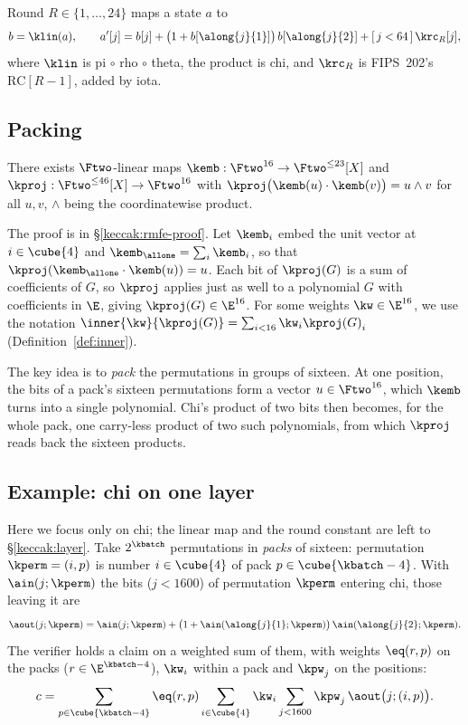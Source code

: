 Round $R\in\{1,\dots,24\}$ maps a state $a$ to
\begin{equation}\label{keccak:eq:round}
b=\klin(a),\qquad a'[j]=b[j]+\bigl(1+b[\along{j}{1}]\bigr)\,b[\along{j}{2}]+[\,j<64\,]\,\krc_R[j],
\end{equation}
where $\klin$ is pi $\circ$ rho $\circ$ theta, the product is chi, and $\krc_R$ is FIPS~202's $\mathrm{RC}[R-1]$, added by iota.

\subsection{Packing}\label{keccak:rmfe}

\begin{lemma}[Embedding]\label{lem:rmfe}
There exists $\Ftwo$-linear maps $\kemb:\Ftwo^{16}\to\Ftwo^{\le23}[X]$ and $\kproj:\Ftwo^{\le46}[X]\to\Ftwo^{16}$ with $\kproj\bigl(\kemb(u)\cdot\kemb(v)\bigr)=u\wedge v$ for all $u,v$, $\wedge$ being the coordinatewise product.
\end{lemma}

The proof is in \S\ref{keccak:rmfe-proof}. Let $\kemb_i$ embed the unit vector at $i\in\cube{4}$ and $\kemb_{\allone}=\sum_i\kemb_i$, so that $\kproj(\kemb_{\allone}\cdot\kemb(u))=u$. Each bit of $\kproj(G)$ is a sum of coefficients of $G$, so $\kproj$ applies just as well to a polynomial $G$ with coefficients in $\E$, giving $\kproj(G)\in\E^{16}$. For some weights $\kw\in\E^{16}$, we use the notation $\inner{\kw}{\kproj(G)} = \sum_{i < 16} {\kw}_i{\kproj(G)}_i$ (Definition~\ref{def:inner}).

The key idea is to \emph{pack} the permutations in groups of sixteen. At one position, the bits of a pack's sixteen permutations form a vector $u\in\Ftwo^{16}$, which $\kemb$ turns into a single polynomial. Chi's product of two bits then becomes, for the whole pack, one carry-less product of two such polynomials, from which $\kproj$ reads back the sixteen products.

\subsection{Example: chi on one layer}\label{keccak:idea}

Here we focus only on chi; the linear map and the round constant are left to \S\ref{keccak:layer}. Take $2^{\kbatch}$ permutations in \emph{packs} of sixteen: permutation $\kperm=(i,p)$ is number $i\in\cube{4}$ of pack $p\in\cube{\kbatch-4}$. With $\ain(j;\kperm)$ the bits ($j < 1600$) of permutation $\kperm$ entering chi, those leaving it are
\[
\aout(j;\kperm)=\ain(j;\kperm)+\bigl(1+\ain(\along{j}{1};\kperm)\bigr)\,\ain(\along{j}{2};\kperm).
\]
The verifier holds a claim on a weighted sum of them, with weights $\eq(r,p)$ on the packs ($r\in\E^{\kbatch-4}$), $\kw_i$ within a pack and $\kpw_j$ on the positions:
\[
c=\sum_{p\in\cube{\kbatch-4}}\eq(r,p)\sum_{i\in\cube{4}}\kw_i\sum_{j<1600}\kpw_j\,\aout\bigl(j;(i,p)\bigr).
\]

